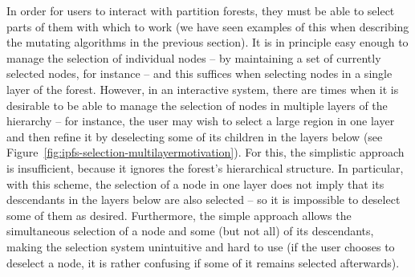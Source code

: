 In order for users to interact with partition forests, they must be able to select parts of them with which to work (we have seen examples of this when describing the mutating algorithms in the previous section). It is in principle easy enough to manage the selection of individual nodes -- by maintaining a set of currently selected nodes, for instance -- and this suffices when selecting nodes in a single layer of the forest. However, in an interactive system, there are times when it is desirable to be able to manage the selection of nodes in multiple layers of the hierarchy -- for instance, the user may wish to select a large region in one layer and then refine it by deselecting some of its children in the layers below (see Figure~\ref{fig:ipfs-selection-multilayermotivation}). For this, the simplistic approach is insufficient, because it ignores the forest's hierarchical structure. In particular, with this scheme, the selection of a node in one layer does not imply that its descendants in the layers below are also selected -- so it is impossible to deselect some of them as desired. Furthermore, the simple approach allows the simultaneous selection of a node and some (but not all) of its descendants, making the selection system unintuitive and hard to use (if the user chooses to deselect a node, it is rather confusing if some of it remains selected afterwards).

